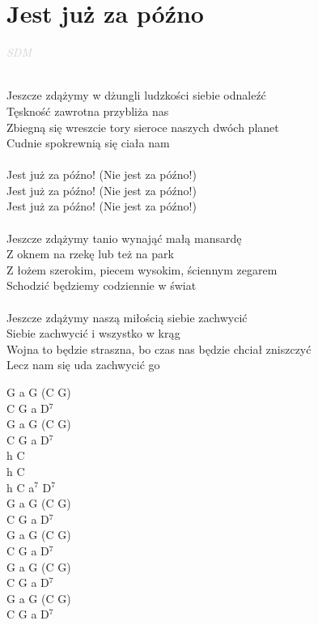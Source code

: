 \documentclass[a5paper, 10pt]{book}
\begin{document}
\section{Jest już za późno}\textcolor{lightgray}{\textit{SDM}}\\~\\
\begin{minipage}[t]{0.8\textwidth}
Jeszcze zdążymy w dżungli ludzkości siebie odnaleźć\\
Tęskność zawrotna przybliża nas\\
Zbiegną się wreszcie tory sieroce naszych dwóch planet\\
Cudnie spokrewnią się ciała nam\\
\\
\hspace*{5mm}Jest już za późno! (Nie jest za późno!)\\
\hspace*{5mm}Jest już za późno! (Nie jest za późno!)\\
\hspace*{5mm}Jest już za późno! (Nie jest za późno!)\\
\\
Jeszcze zdążymy tanio wynająć małą mansardę\\
Z oknem na rzekę lub też na park\\
Z łożem szerokim, piecem wysokim, ściennym zegarem\\
Schodzić będziemy codziennie w świat\\
\\
Jeszcze zdążymy naszą miłością siebie zachwycić\\
Siebie zachwycić i wszystko w krąg\\
Wojna to będzie straszna, bo czas nas będzie chciał zniszczyć\\
Lecz nam się uda zachwycić go\\

\end{minipage}
\begin{minipage}[t]{0.2\textwidth}
G a G (C G)\\
C G a D$^7$\\
G a G (C G)\\
C G a D$^7$\\

h C\\
h C\\
h C a$^7$ D$^7$\\

G a G (C G)\\
C G a D$^7$\\
G a G (C G)\\
C G a D$^7$\\

G a G (C G)\\
C G a D$^7$\\
G a G (C G)\\
C G a D$^7$\\
\end{minipage}
\end{document}
